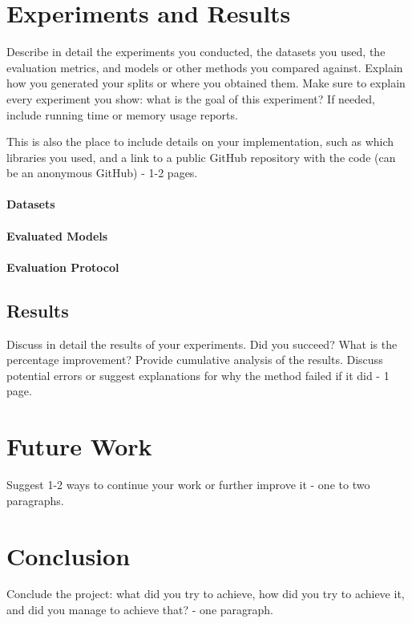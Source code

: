 \documentclass{acmart}
\begin{document}
\section{Experiments and Results}
Describe in detail the experiments you conducted, the datasets you used, the evaluation metrics, and models or other methods you compared against. Explain how you generated your splits or where you obtained them. Make sure to explain every experiment you show: what is the goal of this experiment? If needed, include running time or memory usage reports.

This is also the place to include details on your implementation, such as which libraries you used, and a link to a public GitHub repository with the code (can be an anonymous GitHub) - 1-2 pages.

\paragraph{Datasets}

\paragraph{Evaluated Models}

\paragraph{Evaluation Protocol}

\subsection{Results}
Discuss in detail the results of your experiments. Did you succeed? What is the percentage improvement? Provide cumulative analysis of the results. Discuss potential errors or suggest explanations for why the method failed if it did - 1 page.

\section{Future Work}
Suggest 1-2 ways to continue your work or further improve it - one to two paragraphs.

\section{Conclusion}
Conclude the project: what did you try to achieve, how did you try to achieve it, and did you manage to achieve that? - one paragraph.



\end{document}
